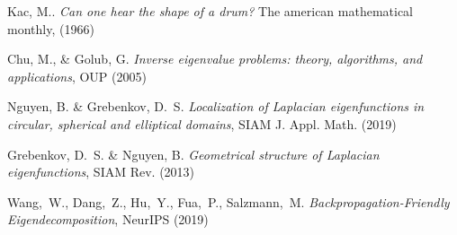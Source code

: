 \documentclass[a4paper,11pt]{article}
\begin{document}





    \vspace{-1.5em}
\renewcommand{\refname}{\normalsize Références}
%
\begin{thebibliography}{99}
\vspace{-1em}
{\scriptsize
{}
	Kac, M..
	{\it Can one hear the shape of a drum?}
	The american mathematical monthly, (1966)

	Chu, M., \& Golub, G.
	{\it Inverse eigenvalue problems: theory, algorithms, and
	applications}, OUP (2005)

	Nguyen, B. \& Grebenkov, D.~S.
	{\it Localization of Laplacian eigenfunctions in circular, spherical
	and elliptical domains}, SIAM J.  Appl. Math. (2019)

	Grebenkov, D.~S.  \& Nguyen, B.
	{\it Geometrical structure of Laplacian eigenfunctions},
	SIAM Rev. (2013)

	Wang,~W., Dang,~Z., Hu,~Y., Fua,~P., Salzmann,~M.
	{\it Backpropagation-Friendly Eigendecomposition},
	NeurIPS (2019)

}
\end{thebibliography}
\end{document}
